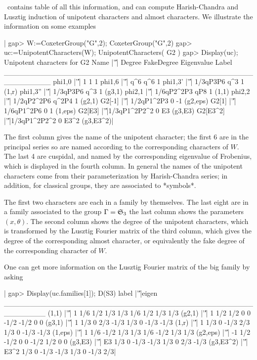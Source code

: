 \CHEVIE\   contains  table  of  all   this  information,  and  can  compute
Harish-Chandra  and  Lusztig  induction  of  unipotent characters and almost
characters. We illustrate the information on some examples\:

|    gap> W:=CoxeterGroup("G",2);
    CoxeterGroup("G",2)
    gap> uc:=UnipotentCharacters(W);
    UnipotentCharacters( G2 )
    gap> Display(uc);
    Unipotent characters for G2
          Name |'\|'|      Degree FakeDegree Eigenvalue     Label
    _________________________________________________________
    phi{1,0}   |'\|'|           1          1          1
    phi{1,6}   |'\|'|         q^6        q^6          1
    phi{1,3}'  |'\|'|    1/3qP3P6        q^3          1     (1,r)
    phi{1,3}'' |'\|'|    1/3qP3P6        q^3          1    (g3,1)
    phi{2,1}   |'\|'|  1/6qP2^2P3        qP8          1     (1,1)
    phi{2,2}   |'\|'|  1/2qP2^2P6      q^2P4          1    (g2,1)
    G2[-1]     |'\|'|  1/2qP1^2P3          0         -1  (g2,eps)
    G2[1]      |'\|'|  1/6qP1^2P6          0          1   (1,eps)
    G2[E3]     |'\|'|1/3qP1^2P2^2          0         E3   (g3,E3)
    G2[E3^2]   |'\|'|1/3qP1^2P2^2          0       E3^2 (g3,E3^2)|

The first column gives the name of the unipotent character; the first 6 are
in  the  principal  series  so  are  named  according  to the corresponding
characters  of $W$. The last 4 are cuspidal, and named by the corresponding
eigenvalue  of  Frobenius,  which  is  displayed  in  the fourth column. In
general   the   names   of   the   unipotent  characters  come  from  their
parameterization  by  Harish-Chandra  series;  in  addition,  for  classical
groups, they are associated to *symbols*.

The first two characters are each in a family by themselves. The last eight
are  in a family associated to  the group $\Gamma={\mathfrak S}_3$\: the last column
shows  the parameters $(x,\theta)$.  The second column  shows the degree of
the  unipotent  characters,  which  is  transformed  by the Lusztig Fourier
matrix  of the  third column,  which gives  the degree of the corresponding
almost  character,  or  equivalently  the  fake degree of the corresponding
character of $W$.

One can get more information on the Lusztig Fourier matrix of the big family
by asking

|    gap> Display(uc.families[1]);
    D(S3)
        label |'\|'|eigen
    ________________________________________________________
    (1,1)     |'\|'|    1 1/6  1/2  1/3  1/3  1/6  1/2  1/3  1/3
    (g2,1)    |'\|'|    1 1/2  1/2    0    0 -1/2 -1/2    0    0
    (g3,1)    |'\|'|    1 1/3    0  2/3 -1/3  1/3    0 -1/3 -1/3
    (1,r)     |'\|'|    1 1/3    0 -1/3  2/3  1/3    0 -1/3 -1/3
    (1,eps)   |'\|'|    1 1/6 -1/2  1/3  1/3  1/6 -1/2  1/3  1/3
    (g2,eps)  |'\|'|   -1 1/2 -1/2    0    0 -1/2  1/2    0    0
    (g3,E3)   |'\|'|   E3 1/3    0 -1/3 -1/3  1/3    0  2/3 -1/3
    (g3,E3^2) |'\|'| E3^2 1/3    0 -1/3 -1/3  1/3    0 -1/3  2/3|

